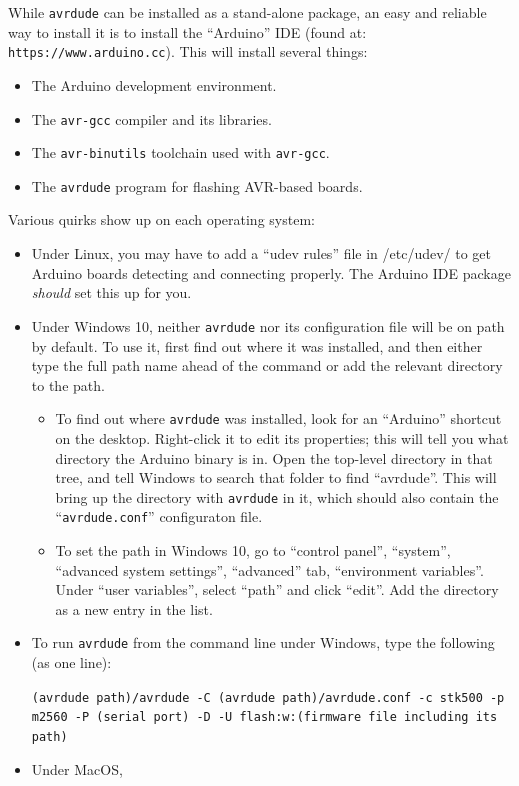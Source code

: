 While \texttt{avrdude} can be installed as a stand-alone package, an easy and
reliable way to install it is to install the ``Arduino'' IDE (found at:
\verb|https://www.arduino.cc|). This will install several things:
\begin{itemize}
\item The Arduino development environment.
\item The \texttt{avr-gcc} compiler and its libraries.
\item The \texttt{avr-binutils} toolchain used with \texttt{avr-gcc}.
\item The \texttt{avrdude} program for flashing AVR-based boards.
\end{itemize}

Various quirks show up on each operating system:
\begin{itemize}

\item Under Linux, you may have to add a ``udev rules'' file in /etc/udev/ to
get Arduino boards detecting and connecting properly. The Arduino IDE package
\textit{should} set this up for you.

\item Under Windows 10, neither \texttt{avrdude} nor its configuration file
will be on path by default. To use it, first find out where it was installed,
and then either type the full path name ahead of the command or add the
relevant directory to the path.
\begin{itemize}
\item To find out where \texttt{avrdude} was installed, look for an
``Arduino'' shortcut on the desktop. Right-click it to edit its properties;
this will tell you what directory the Arduino binary is in. Open the
top-level directory in that tree, and tell Windows to search that folder
to find ``avrdude''. This will bring up the directory with \texttt{avrdude}
in it, which should also contain the ``\texttt{avrdude.conf}'' configuraton
file.
\item To set the path in Windows 10, go to ``control panel'', ``system'',
``advanced system settings'', ``advanced'' tab, ``environment variables''.
Under ``user variables'', select ``path'' and click ``edit''. Add the
directory as a new entry in the list.
\end{itemize}
\item To run \texttt{avrdude} from the command line under Windows, type the
following (as one line):

\texttt{(avrdude path)/avrdude -C (avrdude path)/avrdude.conf
-c stk500 -p m2560 -P (serial port)
-D -U flash:w:(firmware file including its path)}

\item Under MacOS, 

\end{itemize}

%
